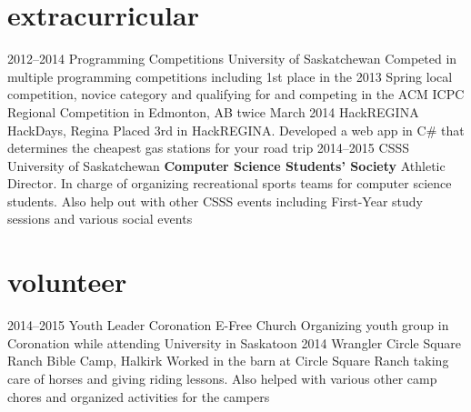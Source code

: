 \documentclass[print]{friggeri-cv} %
\begin{document}
\section{extracurricular}
\begin{entrylist}
\entry
{2012--2014}
{Programming Competitions}
{University of Saskatchewan}
{Competed in multiple programming competitions including 
1st place in the 2013 Spring local competition, novice category and 
qualifying for and competing in the ACM ICPC Regional Competition in 
Edmonton, AB twice}
\entry
{March 2014}
{HackREGINA}
{HackDays, Regina}
{Placed 3rd in HackREGINA. Developed a web app in C\# that 
determines the cheapest gas stations for your road trip}
\entry
{2014--2015}
{CSSS}
{University of Saskatchewan}
{\textbf{Computer Science Students' Society} Athletic Director. 
In charge of organizing recreational sports teams for computer 
science students. Also help out with other CSSS events including 
First-Year study sessions and various social events}
\end{entrylist}

\section{volunteer}
\begin{entrylist}
\entry
{2014--2015}
{Youth Leader}
{Coronation E-Free Church}
{Organizing youth group in Coronation while attending 
University in Saskatoon}
\entry
{\hspace{2.7em}2014}
{Wrangler}
{Circle Square Ranch Bible Camp, Halkirk}
{Worked in the barn at Circle Square Ranch taking care of horses 
and giving riding lessons. Also helped with various other camp 
chores and organized activities for the campers} 

\end{entrylist}
\pagebreak
\end{document}
